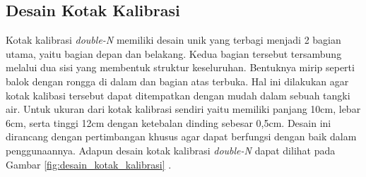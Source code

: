 \subsection{Desain Kotak Kalibrasi}
Kotak kalibrasi \textit{double-N} memiliki desain unik yang terbagi menjadi 2 bagian utama, yaitu bagian depan dan belakang. Kedua bagian tersebut tersambung melalui dua sisi yang membentuk struktur keseluruhan. Bentuknya mirip seperti balok dengan rongga di dalam dan bagian atas terbuka. Hal ini dilakukan agar kotak kalibasi tersebut dapat ditempatkan dengan mudah dalam sebuah tangki air. Untuk ukuran dari kotak kalibrasi sendiri yaitu memiliki panjang 10cm, lebar 6cm, serta tinggi 12cm dengan ketebalan dinding sebesar 0,5cm. Desain ini dirancang dengan pertimbangan khusus agar dapat berfungsi dengan baik dalam penggunaannya. Adapun desain kotak kalibrasi \textit{double-N} dapat dilihat pada Gambar \ref{fig:desain_kotak_kalibrasi} .

